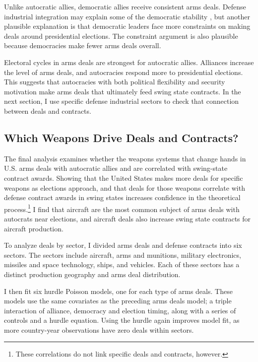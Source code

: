 \documentclass[12pt]{article}
\begin{document}
Unlike autocratic allies, democratic allies receive consistent arms deals. 
Defense industrial integration may explain some of the democratic stability \citep{Brooks2005}, but another plausible explanation is that democratic leaders face more constraints on making deals around presidential elections.
The constraint argument is also plausible because democracies make fewer arms deals overall. 


Electoral cycles in arms deals are strongest for autocratic allies. 
Alliances increase the level of arms deals, and autocracies respond more to presidential elections. 
This suggests that autocracies with both political flexibility and security motivation make arms deals that ultimately feed swing state contracts. 
In the next section, I use specific defense industrial sectors to check that connection between deals and contracts. 



\subsection{Which Weapons Drive Deals and Contracts?} 


The final analysis examines whether the weapons systems that change hands in U.S. arms deals with autocratic allies and are correlated with swing-state contract awards. 
Showing that the United States makes more deals for specific weapons as elections approach, and that deals for those weapons correlate with defense contract awards in swing states increases confidence in the theoretical process.\footnote{These correlations do not link specific deals and contracts, however.}
I find that aircraft are the most common subject of arms deals with autocrats near elections, and aircraft deals also increase swing state contracts for aircraft production.


To analyze deals by sector, I divided arms deals and defense contracts into six sectors. 
The sectors include aircraft, arms and munitions, military electronics, missiles and space technology, ships, and vehicles.  
Each of these sectors has a distinct production geography and arms deal distribution.


I then fit six hurdle Poisson models, one for each type of arms deals. 
These models use the same covariates as the preceding arms deals model; a triple interaction of alliance, democracy and election timing, along with a series of controls and a hurdle equation.
Using the hurdle again improves model fit, as more country-year observations have zero deals within sectors. 
\end{document}
